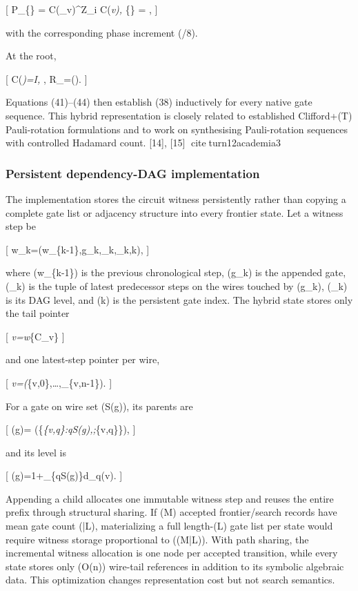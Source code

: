 \documentclass[
]{article}
\begin{document}
{[} P\_\{\} = C(\Theta\_v)\^{}\dagger Z\_i C(\Theta\emph{v),
\qquad \theta}\{\} = \pm{},  {]}

with the corresponding phase increment (\pm\pi/8).

At the root,

{[} C(\Theta\emph{\varnothing)=I, \qquad \phi}, \qquad
\mathcal R\_\varnothing=().  {]}

Equations (41)--(44) then establish (38) inductively for every native
gate sequence. This hybrid representation is closely related to
established Clifford+(T) Pauli-rotation formulations and to work on
synthesising Pauli-rotation sequences with controlled Hadamard count.
{[}14{]}, {[}15{]} citeturn12academia3

\hypertarget{persistent-dependency-dag-implementation}{%
\subsubsection{Persistent dependency-DAG
implementation}\label{persistent-dependency-dag-implementation}}

The implementation stores the circuit witness persistently rather than
copying a complete gate list or adjacency structure into every frontier
state. Let a witness step be

{[} w\_k=(w\_\{k-1\},g\_k,\_k,\ell\_k,k), 
{]}

where (w\_\{k-1\}) is the previous chronological step, (g\_k) is the
appended gate, (\_k) is the tuple of latest
predecessor steps on the wires touched by (g\_k), (\ell\_k) is its DAG
level, and (k) is the persistent gate index. The hybrid state stores
only the tail pointer

{[} \tau\emph{v=w}\{\textbar C\_v\}  {]}

and one latest-step pointer per wire,

{[} \boldsymbol\tau\emph{v=(\tau}\{v,0\},\ldots,\tau\_\{v,n-1\}).
 {]}

For a gate on wire set (S(g)), its parents are

{[} (g)=
\left(\{\tau\emph{\{v,q\}:q\in S(g),;\tau}\{v,q\}\neq\varnothing\}\right),
 {]}

and its level is

{[} \ell(g)=1+\max\_\{q\in S(g)\}d\_q(v).  {]}

Appending a child allocates one immutable witness step and reuses the
entire prefix through structural sharing. If (M) accepted
frontier/search records have mean gate count (\bar L), materializing a
full length-(L) gate list per state would require witness storage
proportional to (\Theta(M\bar L)). With path sharing, the incremental
witness allocation is one node per accepted transition, while every
state stores only (O(n)) wire-tail references in addition to its
symbolic algebraic data. This optimization changes representation cost
but not search semantics.
\end{document}
